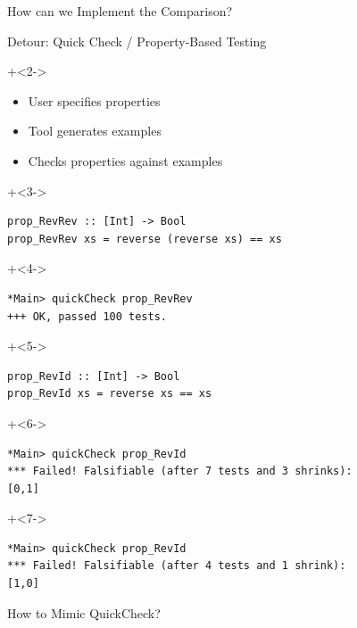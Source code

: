 \begin{frame}[fragile]{}

\begin{center}
{\Huge
How can we Implement the Comparison?
}
\end{center}

\end{frame}

\begin{frame}[fragile]{Detour: Quick Check / Property-Based Testing}

\onslide+<2->
\begin{itemize}
\item User specifies properties
\item Tool generates examples
\item Checks properties against examples
\end{itemize}

\onslide+<3->
\begin{lstlisting}
prop_RevRev :: [Int] ->	Bool
prop_RevRev xs = reverse (reverse xs) == xs
\end{lstlisting}

\onslide+<4->
\begin{lstlisting}
*Main> quickCheck prop_RevRev
+++ OK, passed 100 tests.
\end{lstlisting}

\onslide+<5->
\begin{lstlisting}
prop_RevId :: [Int] -> Bool
prop_RevId xs = reverse xs == xs
\end{lstlisting}

\onslide+<6->
\begin{lstlisting}
*Main> quickCheck prop_RevId 
*** Failed! Falsifiable (after 7 tests and 3 shrinks):    
[0,1]
\end{lstlisting}

\onslide+<7->
\vspace{-0.55em}
\begin{lstlisting}
*Main> quickCheck prop_RevId 
*** Failed! Falsifiable (after 4 tests and 1 shrink):     
[1,0]
\end{lstlisting}

\end{frame}

\begin{frame}[fragile]{}

\begin{center}
{\Huge
How to Mimic QuickCheck?
}
\end{center}

\end{frame}


